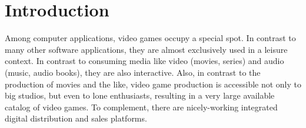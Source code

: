
\section{Introduction}

Among computer applications, video games occupy a special spot.
In contrast to many other software applications, they are almost
exclusively used in a leisure context.
In contrast to consuming media like video (movies, series) and
audio (music, audio books), they are also interactive.
Also, in contrast to the production of movies and the like, video game
production is accessible not only to big studios, but even to lone
enthusiasts, resulting in a very large available catalog of video games.
To complement, there are nicely-working integrated digital distribution
and sales platforms.







